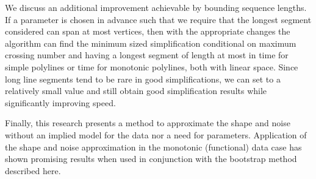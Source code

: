 \documentclass{article}
\begin{document}
We discuss an additional improvement achievable by bounding sequence lengths. 
If a parameter  is chosen in advance such that we require that the
longest segment considered can span at most  vertices, then with the
appropriate changes the algorithm can find the minimum sized simplification
conditional on maximum crossing number and having a longest segment of
length at most  in  time for simple polylines or 
time for monotonic polylines, both with linear space.  Since long line
segments tend to be rare in good simplifications, we can set  to a relatively
small value and still obtain good simplification results while significantly
improving speed.

Finally, this research presents a method to approximate the shape and noise
without an implied model for the data nor a need for parameters. 
Application of the shape and noise approximation in the monotonic (functional)
data case has shown promising results when used in conjunction with the
bootstrap method described here.
	


\end{document}
